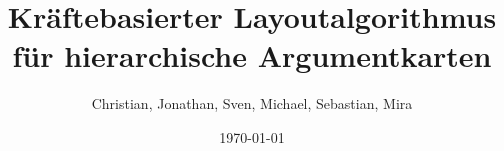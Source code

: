 \begin{titlepage}
\author{Christian, Jonathan, Sven, Michael, Sebastian, Mira}
\date{\today}

\title{\vspace{3cm}Kräftebasierter Layoutalgorithmus für hierarchische Argumentkarten}
\maketitle
\end{titlepage}
